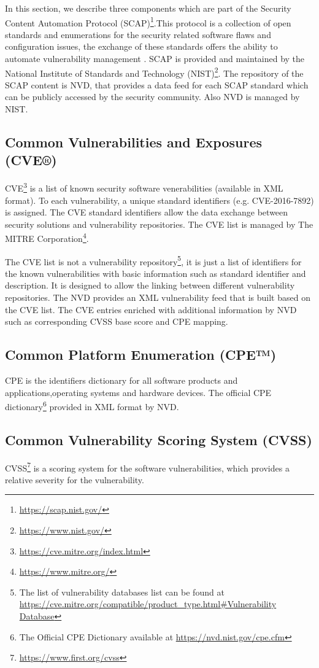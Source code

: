 \documentclass{llncs}
\begin{document}
 In	this section, we describe three	components which are part of the Security	 Content	Automation	Protocol (SCAP)\footnote{\url{https://scap.nist.gov/}}.This protocol is a collection of open standards and enumerations for the	security related software flaws	 and configuration issues, the exchange of these	standards	offers	the	ability	to	automate	vulnerability	management \cite{scap_doc}.		
 SCAP is provided	and	maintained	by	the	National	Institute	of	Standards	and	Technology (NIST)\footnote{\url{https://www.nist.gov/}}.	The	repository	of	the	SCAP	content	is	NVD, that provides	a data	feed for each SCAP	standard	
 which can	be	publicly accessed	by	the	security	community.	Also NVD is	managed	by NIST.
 
 
 \subsection{Common Vulnerabilities and Exposures (CVE®)} 
 CVE\footnote{\url{https://cve.mitre.org/index.html}} is a list of known security software venerabilities (available in XML format). To each vulnerability, a unique standard identifiers (e.g. CVE-2016-7892) is assigned. The CVE standard identifiers allow the data exchange between security solutions and vulnerability repositories. The CVE list is managed by The MITRE Corporation\footnote{\url{https://www.mitre.org/}}.

 The CVE list is not a vulnerability repository\footnote{The list of vulnerability databases list can be found at \url{https://cve.mitre.org/compatible/product_type.html\#Vulnerability Database}}, it is just a list of identifiers for the known vulnerabilities with basic information such as standard identifier and description. It is designed to allow the linking between different vulnerability repositories. The NVD provides an XML vulnerability feed that is built based on the CVE list. The CVE entries enriched with additional information by NVD such as corresponding CVSS base score and CPE mapping.    
 
 \subsection{Common Platform Enumeration (CPE™)}
 CPE is the identifiers dictionary for all software products and applications,operating systems and hardware devices. The official CPE dictionary\footnote{The Official CPE Dictionary available at \url{https://nvd.nist.gov/cpe.cfm}} provided in XML format by NVD.
  
 \subsection{Common Vulnerability Scoring System (CVSS)}
 CVSS\footnote{\url{https://www.first.org/cvss}} is a scoring system for the software  vulnerabilities, which provides a relative severity for the vulnerability.
 
\end{document}
